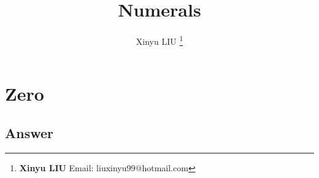 \documentclass[b5paper]{article}
\begin{document}
\title{Numerals}

\author{Xinyu LIU
\thanks{{\bfseries Xinyu LIU} \newline
  Email: liuxinyu99@hotmail.com \newline}
  }

\maketitle
\fi


\ifx\wholebook\relax
\chapter{Zero}
\fi



\ifx\wholebook\relax \else
\section{Answer}
\shipoutAnswer


\begin{thebibliography}{99}

\end{thebibliography}

\expandafter\enddocument
\fi
\end{document}
